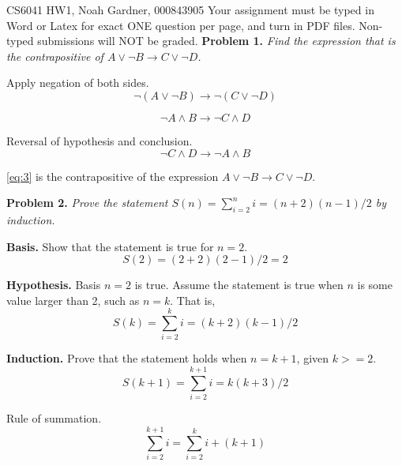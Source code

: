 \documentclass[12pt]{article}
\begin{document}
CS6041 HW1, Noah Gardner, 000843905\newline
Your assignment must be typed in Word or Latex for exact ONE question per page,
and turn in PDF files. Non-typed submissions will NOT be graded.
\newline\newline
\textbf{Problem 1. }\textit{Find the expression that is the contrapositive of $A
        \lor \neg B \to C \lor \neg D$.} \newline

Apply negation of both sides.
\begin{equation}
    \neg (A \lor \neg B) \to \neg (C \lor \neg D)
\end{equation}

\begin{equation}
    \neg A \wedge B \to \neg C \wedge D
\end{equation}

Reversal of hypothesis and conclusion.
\begin{equation}
    \neg C \wedge D \to \neg A \wedge B
    \label{eq:3}
\end{equation}

\eqref{eq:3} is the contrapositive of the expression $A \lor \neg B \to C \lor
    \neg D$.

\newpage
\textbf{Problem 2. }\textit{Prove the statement $S(n) = \sum_{i=2}^n i =
        (n+2)(n-1)/2$ by induction.} \newline

\textbf{Basis. } Show that the statement is true for $n=2$.
\begin{equation}
    S(2) = (2+2)(2-1)/2 = 2
\end{equation}

\textbf{Hypothesis. } Basis $n=2$ is true. Assume the statement is true when $n$
is some value larger than 2, such as $n=k$. That is, \newline
\begin{equation}
    S(k) = \sum_{i=2}^k i = (k+2)(k-1)/2
    \label{eq:5}
\end{equation}

\textbf{Induction. } Prove that the statement holds when $n=k+1$, given $k>=2$.
\begin{equation}
    S(k+1) = \sum_{i=2}^{k+1} i = k(k+3)/2
    \label{eq:6}
\end{equation}

Rule of summation.
\begin{equation}
    \sum_{i=2}^{k+1} i = \sum_{i=2}^k i + (k+1)
    \label{eq:7}
\end{equation}
\end{document}

